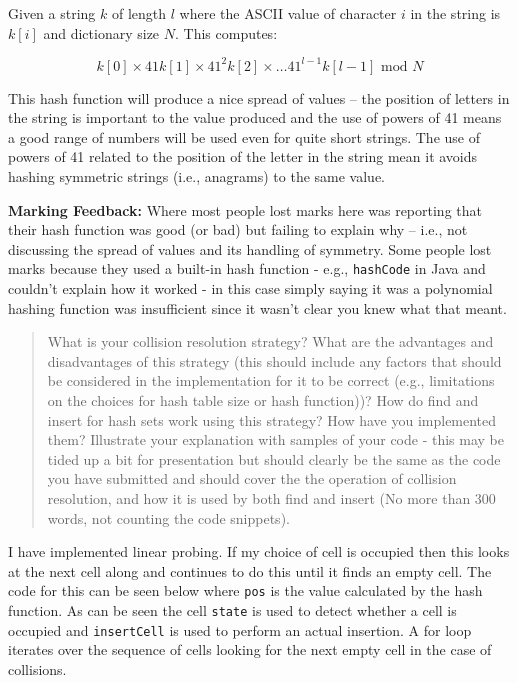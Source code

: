 \documentclass[a4]{article}
\begin{document}
Given a string $k$ of length $l$ where the ASCII value of character $i$ in the string is  $k[i]$ and dictionary size $N$.  This computes:

$$k[0] \times 41 k[1] \times 41^2 k[2] \times \ldots 41^{l-1} k[l - 1] \text{ mod } N$$

This hash function will produce a nice spread of values -- the position of letters in the string is important to the value produced and the use of powers of 41 means a good range of numbers will be used even for quite short strings.  The use of powers of 41 related to the position of the letter in the string mean it avoids hashing symmetric strings (i.e., anagrams) to the same value.

{\bf Marking Feedback:}  Where most people lost marks here was reporting that their hash function was good (or bad) but failing to explain why -- i.e., not discussing the spread of values and its handling of symmetry.  Some people lost marks because they used a built-in hash function - e.g., \texttt{hashCode} in Java and couldn't explain how it worked - in this case simply saying it was a polynomial hashing function was insufficient since it wasn't clear you knew what that meant.

\begin{quote}
What is your collision resolution strategy? What are the advantages and disadvantages of this strategy (this should include any factors that should be considered in the implementation for it to be correct (e.g., limitations on the choices for hash table size or hash function))?  How do find and insert for hash sets work using this strategy?  How have you implemented them?  Illustrate your explanation with samples of your code - this may be tided up a bit for presentation but should clearly be the same as the code you have submitted and should cover the the operation of collision resolution, and how it is used by both find and insert (No more than 300 words, not counting the code snippets).
\end{quote}

I have implemented linear probing.  If my choice of cell is occupied then this looks at the next cell along and continues to do this until it finds an empty cell.  The code for this can be seen below where \texttt{pos} is the value calculated by the hash function.  As can be seen the cell \texttt{state} is used to detect whether a cell is occupied and \texttt{insertCell} is used to perform an actual insertion.  A for loop iterates over the sequence of cells looking for the next empty cell in the case of collisions.
\end{document}
